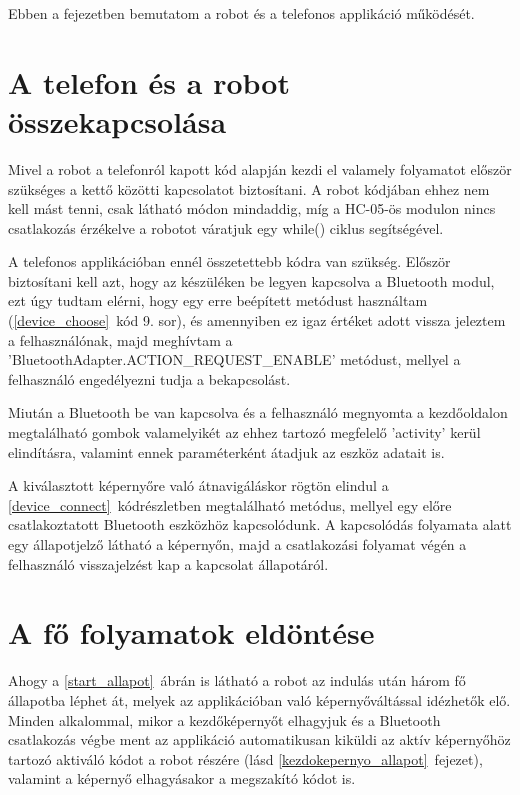 \documentclass[]{thesis-ekf}
\theoremstyle{definition}
\begin{document}
Ebben a fejezetben bemutatom a robot és a telefonos applikáció működését.
\section{A telefon és a robot összekapcsolása}
Mivel a robot a telefonról kapott kód alapján kezdi el valamely folyamatot először szükséges a kettő közötti kapcsolatot biztosítani. A robot kódjában ehhez nem kell mást tenni, csak  látható módon mindaddig, míg a HC-05-ös modulon nincs csatlakozás érzékelve a robotot váratjuk egy while() ciklus segítségével.


A telefonos applikációban ennél összetettebb kódra van szükség. Először biztosítani kell azt, hogy az készüléken be legyen kapcsolva a Bluetooth modul, ezt úgy tudtam elérni, hogy egy erre beépített metódust használtam\cite{Bluetooth_active} (\ref{device_choose}~kód 9. sor), és amennyiben ez igaz értéket adott vissza jeleztem a felhasználónak, majd meghívtam a 'BluetoothAdapter.ACTION\_REQUEST\_ENABLE' metódust\cite{Bluetooth_enable}, mellyel a felhasználó engedélyezni tudja a bekapcsolást. 


Miután a Bluetooth be van kapcsolva és a felhasználó megnyomta a kezdőoldalon megtalálható gombok valamelyikét az ehhez tartozó megfelelő 'activity' kerül elindításra, valamint ennek paraméterként átadjuk az eszköz adatait is.

A kiválasztott képernyőre való átnavigáláskor rögtön elindul a \ref{device_connect}~kódrészletben megtalálható metódus, mellyel egy előre csatlakoztatott Bluetooth eszközhöz kapcsolódunk. A kapcsolódás folyamata alatt egy állapotjelző látható a képernyőn, majd a csatlakozási folyamat végén a felhasználó  visszajelzést kap a kapcsolat állapotáról.

\section{A fő folyamatok eldöntése}
Ahogy a \ref{start_allapot}~ábrán is látható a robot az indulás után három fő állapotba léphet át, melyek az applikációban való képernyőváltással idézhetők elő. Minden alkalommal, mikor a kezdőképernyőt elhagyjuk és a Bluetooth csatlakozás végbe ment az applikáció automatikusan kiküldi az aktív képernyőhöz tartozó aktiváló kódot a robot részére (lásd \ref{kezdokepernyo_allapot}~fejezet), valamint a képernyő elhagyásakor a megszakító kódot is.
\end{document}
